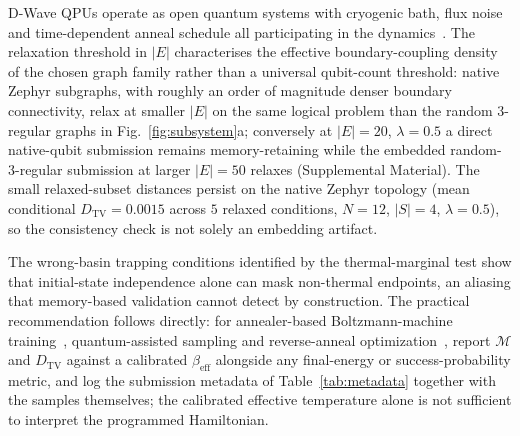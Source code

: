 \documentclass[aps,prapplied,reprint,superscriptaddress,floatfix,nofootinbib]{revtex4-2}
\begin{document}
D-Wave QPUs operate as open quantum systems with cryogenic bath, flux noise and time-dependent anneal schedule all participating in the dynamics~\cite{albash2018adiabatic,mehta2025dwave,mehta2025unraveling,aronoff2026coherence}.
The relaxation threshold in $|E|$ characterises the effective boundary-coupling density of the chosen graph family rather than a universal qubit-count threshold: native Zephyr subgraphs, with roughly an order of magnitude denser boundary connectivity, relax at smaller $|E|$ on the same logical problem than the random 3-regular graphs in Fig.~\ref{fig:subsystem}a; conversely at $|E|=20$, $\lambda=0.5$ a direct native-qubit submission remains memory-retaining while the embedded random-3-regular submission at larger $|E|=50$ relaxes (Supplemental Material).
The small relaxed-subset distances persist on the native Zephyr topology (mean conditional $D_\mathrm{TV}=0.0015$ across $5$ relaxed conditions, $N=12$, $|S|=4$, $\lambda=0.5$), so the consistency check is not solely an embedding artifact.

The wrong-basin trapping conditions identified by the thermal-marginal test show that initial-state independence alone can mask non-thermal endpoints, an aliasing that memory-based validation cannot detect by construction.
The practical recommendation follows directly: for annealer-based Boltzmann-machine training~\cite{adachi2015qbm,amin2018qbm,benedetti2017qbm}, quantum-assisted sampling and reverse-anneal optimization~\cite{marshall2019pausing,chen2020pausing,pelofske2025erasing,nelson2022gibbs,vuffray2022boltzmann,grattan2025thermometry}, report $\mathcal{M}$ and $D_\mathrm{TV}$ against a calibrated $\beta_\mathrm{eff}$ alongside any final-energy or success-probability metric, and log the submission metadata of Table~\ref{tab:metadata} together with the samples themselves; the calibrated effective temperature alone is not sufficient to interpret the programmed Hamiltonian.
\end{document}
